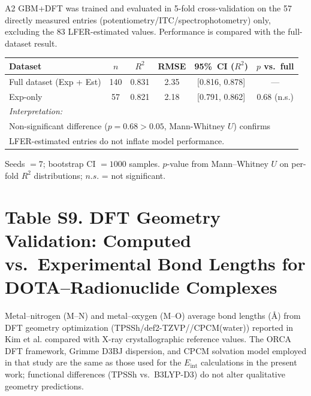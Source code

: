 \documentclass[journal=jacsat,manuscript=suppinfo]{achemso}
\begin{document}
A2 GBM+DFT was trained and evaluated in 5-fold cross-validation on the 57
directly measured entries (potentiometry/ITC/spectrophotometry) only,
excluding the 83 LFER-estimated values.
Performance is compared with the full-dataset result.

\begin{table}[h!]
  \centering
  \begin{tabular}{@{}lccccc@{}}
    \toprule
    Dataset & $n$ & $R^2$ & RMSE & 95\%~CI ($R^2$) & $p$ vs.\ full \\
    \midrule
    Full dataset (Exp + Est) & 140 & 0.831 & 2.35 & [0.816, 0.878] & --- \\
    Exp-only                 &  57 & 0.821 & 2.18 & [0.791, 0.862] & 0.68 (n.s.) \\
    \midrule
    \multicolumn{6}{l}{\textit{Interpretation:}} \\
    \multicolumn{6}{l}{Non-significant difference ($p = 0.68 > 0.05$, Mann-Whitney $U$) confirms} \\
    \multicolumn{6}{l}{LFER-estimated entries do not inflate model performance.} \\
    \bottomrule
  \end{tabular}
\end{table}

Seeds $= 7$; bootstrap CI $= 1000$ samples. $p$-value from Mann--Whitney $U$
on per-fold $R^2$ distributions; $n.s.$ = not significant.


\newpage

\section*{Table S9. DFT Geometry Validation: Computed vs.\ Experimental Bond Lengths
for DOTA--Radionuclide Complexes}
\label{tab:s9}

Metal--nitrogen (M--N) and metal--oxygen (M--O) average bond lengths (\AA) from
DFT geometry optimization (TPSSh/def2-TZVP//CPCM(water)) reported in Kim
et al.\cite{Kim2026molpharm} compared with X-ray crystallographic reference
values. The ORCA DFT framework, Grimme D3BJ dispersion, and CPCM solvation
model employed in that study are the same as those used for the $E_\mathrm{int}$
calculations in the present work; functional differences (TPSSh vs.\ B3LYP-D3)
do not alter qualitative geometry predictions.
\end{document}
